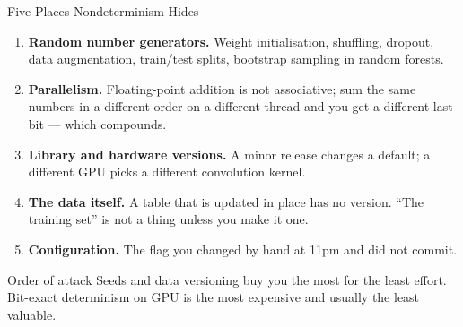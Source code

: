 
\begin{frame}{Five Places Nondeterminism Hides}

    \begin{enumerate}
        \setlength\itemsep{0.45em}
        \item \textbf{Random number generators.} Weight initialisation, shuffling, dropout, data
              augmentation, train/test splits, bootstrap sampling in random forests.
        \item \textbf{Parallelism.} Floating-point addition is not associative; sum the same numbers in a
              different order on a different thread and you get a different last bit --- which compounds.
        \item \textbf{Library and hardware versions.} A minor release changes a default; a different GPU
              picks a different convolution kernel.
        \item \textbf{The data itself.} A table that is updated in place has no version. ``The training
              set'' is not a thing unless you make it one.
        \item \textbf{Configuration.} The flag you changed by hand at 11pm and did not commit.
    \end{enumerate}

    \vspace{0.8em}
    \begin{block}{Order of attack}
        Seeds and data versioning buy you the most for the least effort. Bit-exact determinism on GPU is
        the most expensive and usually the least valuable.
    \end{block}

\end{frame}

